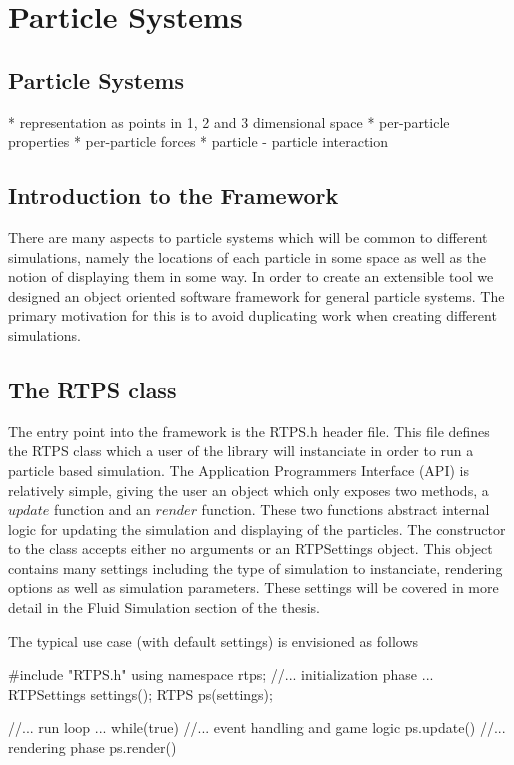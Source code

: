 \chapter{Particle Systems}

\section{Particle Systems}
* representation as points in 1, 2 and 3 dimensional space
* per-particle properties
* per-particle forces
* particle - particle interaction


\section{Introduction to the Framework}

There are many aspects to particle systems which will be common to different
simulations, namely the locations of each particle in some space as well as the
notion of displaying them in some way. In order to create an extensible tool we
designed an object oriented software framework for general particle systems.
The primary motivation for this is to avoid duplicating work when creating
different simulations.

\section{The RTPS class}

The entry point into the framework is the RTPS.h header file. This file defines
the RTPS class which a user of the library will instanciate in order to run a
particle based simulation. The Application Programmers Interface (API) is
relatively simple, giving the user an object which only exposes two methods, a
$update$ function and an $render$ function. These two functions abstract
internal logic for updating the simulation and displaying of the particles. The
constructor to the class accepts either no arguments or an RTPSettings object.
This object contains many settings including the type of simulation to
instanciate, rendering options as well as simulation parameters. These settings
will be covered in more detail in the Fluid Simulation section of the thesis.

The typical use case (with default settings) is envisioned as follows
\begin{cppcode}[0]
#include "RTPS.h"
using namespace rtps;
//... initialization phase ...
RTPSettings settings();
RTPS ps(settings);

//... run loop ...
while(true)
{
    //... event handling and game logic
    ps.update()
    //... rendering phase
    ps.render()
}

\end{cppcode}

